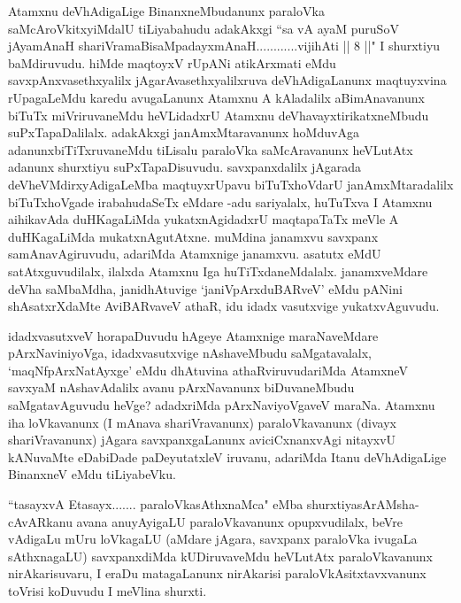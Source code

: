 \begin{artha}
Atamxnu deVhAdigaLige BinanxneMbudanunx paraloVka saMcAroVkitxyiMdalU tiLiyabahudu adakAkxgi ``sa vA ayaM puruSoV jAyamAnaH shariVramaBisaMpadayxmAnaH............vijihAti || 8 ||" I shurxtiyu baMdiruvudu. hiMde maqtoyxV rUpANi atikArxmati eMdu savxpAnxvasethxyalilx jAgarAvasethxyalilxruva deVhAdigaLanunx maqtuyxvina rUpagaLeMdu karedu avugaLanunx Atamxnu A kAladalilx aBimAnavanunx biTuTx miVriruvaneMdu heVLidadxrU Atamxnu deVhavayxtirikatxneMbudu suPxTapaDalilalx. adakAkxgi janAmxMtaravanunx hoMduvAga adanunx\break biTiTxruvaneMdu tiLisalu paraloVka saMcAravanunx heVLutAtx adanunx shurxtiyu suPxTapaDisuvudu. savxpanxdalilx jAgarada deVheVMdirxyAdigaLeMba maqtuyxrUpavu biTuTxhoVdarU janAmxMtaradalilx biTuTx\-\break hoVgade irabahudaSeTx eMdare -adu sariyalalx, huTuTxva I Atamxnu aihikavAda duHKagaLiMda yukatxnAgidadxrU maqtapaTaTx meVle A duHKagaLiMda mukatxnAgutAtxne. muMdina janamxvu savxpanx samAnavAgiruvudu, adariMda Atamxnige janamxvu. asatutx eMdU satAtxguvudilalx, ilalxda Atamxnu Iga huTiTxdaneMdalalx. janamxveMdare deVha saMbaMdha, janidhAtuvige `janiVpArxduBARveV' eMdu pANini shAsatxrXdaMte AviBARvaveV athaR, idu idadx vasutxvige yukatxvAguvudu. 
\end{artha}%

\begin{artha}
idadxvasutxveV horapaDuvudu hAgeye Atamxnige maraNaveMdare pArxNaviniyoVga, idadxvasutxvige nAshaveMbudu saMgatavalalx, `maqNfpArxNatAyxge' eMdu dhAtuvina athaRviruvudariMda AtamxneV savxyaM nAshavAdalilx avanu pArxNavanunx biDuvaneMbudu saMgatavAguvudu heVge? adadxriMda pArxNaviyoVgaveV maraNa. Atamxnu iha loVkavanunx (I mAnava shariVravanunx) paraloVkavanunx (divayx shariVravanunx) jAgara savxpanxgaLanunx aviciCxnanxvAgi nitayxvU kANuvaMte eDabiDade paDeyutatxleV iruvanu, adariMda Itanu deVhAdigaLige BinanxneV eMdu tiLiyabeVku. 
\end{artha}


\begin{artha}
``tasayxvA Etasayx....... paraloVkasAthxnaMca" eMba shurxtiya\break sArAMsha- cAvARkanu avana anuyAyigaLU paraloVkavanunx opupxvudilalx, beVre vAdigaLu mUru loVkagaLU (aMdare jAgara, savxpanx paraloVka ivugaLa sAthxnagaLU) savxpanxdiMda kUDiruvaveMdu heVLutAtx paraloVkavanunx nirAkarisuvaru, I eraDu matagaLanunx nirAkarisi paraloVkAsitxtavxvanunx toVrisi koDuvudu I meVlina shurxti.
\end{artha}

